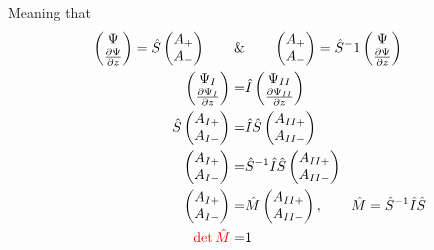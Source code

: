			Meaning that 
			\begin{align}
				\begin{pmatrix}	
					\Psi \\
					\frac{\partial \Psi}{\partial z}
				\end{pmatrix}
				= \hat{S} 
				\begin{pmatrix}
					A_+ \\
					A_- \\
				\end{pmatrix} \qquad\&&\qquad
				\begin{pmatrix}
					A_+ \\
					A_- \\
				\end{pmatrix} = \hat{S}^-1
				\begin{pmatrix}	
					\Psi \\
					\frac{\partial \Psi}{\partial z}
				\end{pmatrix} \\
				\begin{pmatrix}	
					\Psi_{I} \\
					\frac{\partial \Psi_{I}}{\partial z}
				\end{pmatrix} =& 
				\hat{I} \begin{pmatrix}	
					\Psi_{II} \\
					\frac{\partial \Psi_{II}}{\partial z}
					\end{pmatrix} \\
				\hat{S} 
				\begin{pmatrix}
					A_{I+} \\
					A_{I-} \\
				\end{pmatrix} =& 
				\hat{I}\hat{S} 
				\begin{pmatrix}
					A_{II+} \\
					A_{II-} \\
				\end{pmatrix} \\
				\begin{pmatrix}
					A_{I+} \\
					A_{I-} \\
				\end{pmatrix} =& 
				\hat{S}^{-1}\hat{I}\hat{S} 
				\begin{pmatrix}
					A_{II+} \\
					A_{II-} \\
				\end{pmatrix} \\
				\begin{pmatrix}
					A_{I+} \\
					A_{I-} \\
				\end{pmatrix} =& 
				\hat{M} 
				\begin{pmatrix}
					A_{II+} \\
					A_{II-} \\
				\end{pmatrix},\qquad \hat{M} = \hat{S}^{-1}\hat{I}\hat{S} \\
				\textcolor{red}{\det{\hat{M}}} =& 1
			\end{align}
